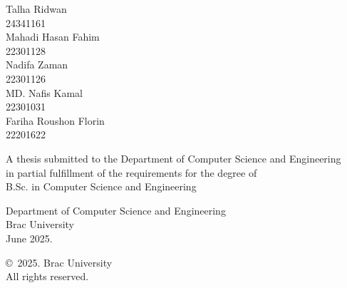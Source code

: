 \begin{titlepage}
\renewcommand*{\thepage}{Title} %

    \begin{center} 
        \vspace*{3cm} %
        
        {\fontsize{16pt}{22pt}\selectfont{Efficient LLM Distillation for Bangladesh Legal Context: A Smartphone-Compatible Retrieval-Augmented Generation Model}
        } %
        
        \vspace{1.5cm}
        
        
        \vspace{0.5cm}
        
        	Talha Ridwan\\
	        24341161\\
	        Mahadi Hasan Fahim\\
	        22301128\\
            Nadifa Zaman\\
	        22301126\\
	        MD. Nafis Kamal\\
	        22301031\\
	        Fariha Roushon Florin\\
                22201622

        \vspace{1.5cm}
        
        	A thesis submitted to the Department of Computer Science and Engineering\\
            in partial fulfillment of the requirements for the degree of\\
            B.Sc. in Computer Science and Engineering

        
        \vspace{2.5cm}
        
    		Department of Computer Science and Engineering\\
            Brac University\\
            June 2025.
        
        \vspace{3cm}
        
    		\copyright\ 2025. Brac University\\
            All rights reserved.
    
    \end{center}

\end{titlepage}